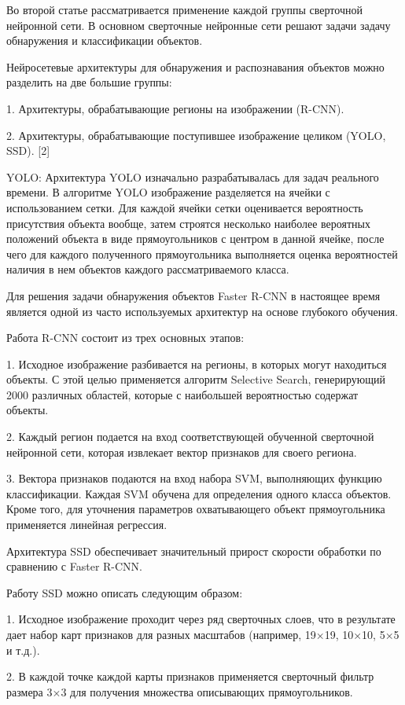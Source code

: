 \documentclass{svproc}
\begin{document}
Во второй статье рассматривается применение каждой группы сверточной нейронной сети. В основном сверточные нейронные сети решают задачи задачу обнаружения и классификации объектов. 

Нейросетевые архитектуры для обнаружения и распознавания объектов можно разделить на две большие группы:

1. Архитектуры, обрабатывающие регионы на изображении (R-CNN).

2. Архитектуры, обрабатывающие поступившее изображение целиком (YOLO, SSD). [2]

YOLO: Архитектура YOLO изначально разрабатывалась для задач реального времени. В алгоритме YOLO изображение разделяется на ячейки с использованием сетки. Для каждой ячейки сетки оценивается
вероятность присутствия объекта вообще, затем строятся несколько наиболее вероятных положений объекта в виде прямоугольников с центром в данной ячейке, после чего для каждого полученного прямоугольника выполняется оценка вероятностей наличия в нем объектов каждого рассматриваемого класса.

Для решения задачи обнаружения объектов Faster R-CNN в настоящее время является одной из часто используемых архитектур на основе глубокого обучения.

Работа R-CNN состоит из трех основных этапов:

1. Исходное изображение разбивается на регионы, в
которых могут находиться объекты. С этой целью применяется алгоритм Selective Search, генерирующий
2000 различных областей, которые с наибольшей вероятностью содержат объекты.

2. Каждый регион подается на вход соответствующей обученной сверточной нейронной сети, которая
извлекает вектор признаков для своего региона.

3. Вектора признаков подаются на вход набора SVM,
выполняющих функцию классификации. Каждая SVM
обучена для определения одного класса объектов. Кроме
того, для уточнения параметров охватывающего объект
прямоугольника применяется линейная регрессия.

Архитектура SSD обеспечивает значительный
прирост скорости обработки по сравнению с Faster
R-CNN.

Работу SSD можно
описать следующим образом:

1. Исходное изображение проходит через ряд сверточных слоев, что в результате дает набор карт признаков для
разных масштабов (например, 19×19, 10×10, 5×5 и т.д.).

2. В каждой точке каждой карты признаков применяется сверточный фильтр размера 3×3 для получения
множества описывающих прямоугольников.
\end{document}
